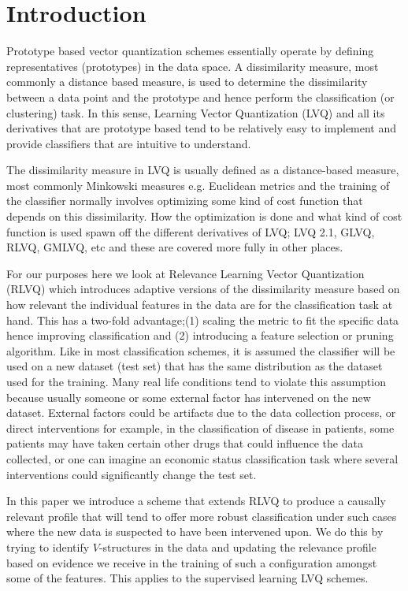 \documentclass{esannV2}
\begin{document}
\section{Introduction}
\label{sec:Introduction}

Prototype based vector quantization schemes essentially operate by defining representatives (prototypes) in the data space. A dissimilarity measure, most commonly a distance based measure, is used to determine the dissimilarity between a data point and the prototype and hence perform the classification (or clustering) task. In this sense, Learning Vector Quantization (LVQ) and all its derivatives that are prototype based tend to be relatively easy to implement and provide classifiers that are intuitive to understand.

The dissimilarity measure in LVQ is usually defined as a distance-based measure, most commonly Minkowski measures e.g. Euclidean metrics and the training of the classifier normally involves optimizing some kind of cost function that depends on this dissimilarity. How the optimization is done and what kind of cost function is used spawn off the different derivatives of LVQ; LVQ 2.1, GLVQ, RLVQ, GMLVQ, etc and these are covered more fully in other places. \cite{07,08,09}

For our purposes here we look at Relevance Learning Vector Quantization (RLVQ)\cite{08} which introduces adaptive versions of the  dissimilarity measure based on how relevant the individual features in the data are for the classification task at hand. This has a two-fold advantage;(1) scaling the metric to fit the specific data hence improving classification and (2) introducing a feature selection or pruning algorithm. Like in most classification schemes, it is assumed the classifier will be used on a new dataset (test set) that has the same distribution as the dataset used for the training. Many real life conditions tend to violate this assumption because usually someone or some external factor has intervened on the new dataset. External factors could be artifacts due to the data collection process, or direct interventions for example, in the classification of disease in patients, some patients may have taken certain other drugs that could influence the data collected, or one can imagine an economic status classification task where several interventions could significantly change the test set. 

In this paper we introduce a scheme that extends RLVQ to produce a causally relevant profile that will tend to offer more robust classification under such cases where the new data is suspected to have been intervened upon. We do this by trying to identify $V$-structures in the data and updating the relevance profile based on evidence we receive in the training of such a configuration amongst some of the features. This applies to the supervised learning LVQ schemes.
\end{document}
